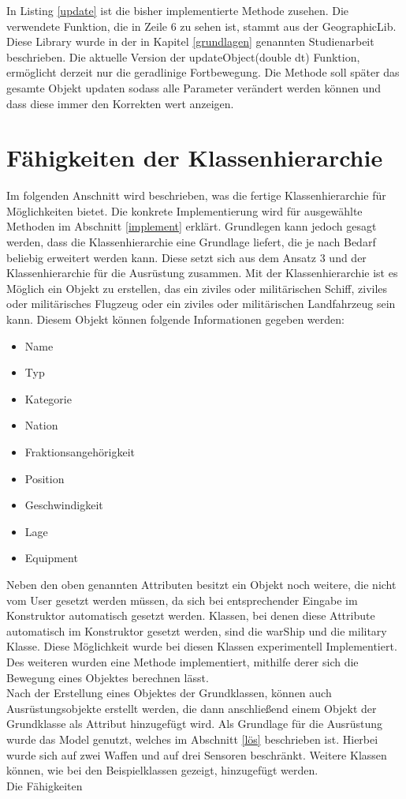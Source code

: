  In  Listing \ref{update} ist die bisher implementierte Methode zusehen. Die verwendete Funktion, die in Zeile 6 zu sehen ist, stammt aus der GeographicLib. Diese Library wurde in der in Kapitel \ref{grundlagen} genannten Studienarbeit beschrieben. Die aktuelle Version der  \glqq updateObject(double dt) \grqq{} Funktion, ermöglicht derzeit nur die geradlinige Fortbewegung. Die Methode soll später das gesamte Objekt updaten sodass alle Parameter verändert werden können und dass diese immer den Korrekten wert anzeigen.
 
 \section{Fähigkeiten der Klassenhierarchie}
Im folgenden Anschnitt wird beschrieben, was die fertige Klassenhierarchie für Möglichkeiten bietet. Die konkrete Implementierung wird für ausgewählte Methoden im Abschnitt \ref{implement} erklärt.
Grundlegen kann jedoch gesagt werden, dass die Klassenhierarchie eine Grundlage liefert, die je nach Bedarf beliebig erweitert werden kann.
Diese setzt sich aus dem Ansatz 3 und der Klassenhierarchie für die Ausrüstung zusammen. 
Mit der Klassenhierarchie ist es Möglich ein Objekt zu erstellen, das ein ziviles oder militärischen Schiff, ziviles oder militärisches Flugzeug oder ein ziviles oder militärischen Landfahrzeug sein kann. Diesem Objekt können folgende Informationen gegeben werden:
\begin{itemize}
	\singlespacing
	\item Name
	\item Typ
	\item Kategorie
	\item Nation
	\item Fraktionsangehörigkeit
	\item Position
	\item Geschwindigkeit
	\item Lage
	\item Equipment
\end{itemize}
Neben den oben genannten Attributen besitzt ein Objekt noch weitere, die nicht vom User gesetzt werden müssen, da sich bei entsprechender Eingabe im Konstruktor automatisch gesetzt werden. Klassen, bei denen diese Attribute automatisch im Konstruktor gesetzt werden, sind die \glqq warShip\grqq{} und die \glqq military\grqq{} Klasse. Diese Möglichkeit wurde bei diesen Klassen experimentell Implementiert.
Des weiteren wurden eine Methode implementiert, mithilfe derer sich die Bewegung eines Objektes berechnen lässt. \\
Nach der Erstellung eines Objektes der Grundklassen, können auch Ausrüstungsobjekte erstellt werden, die dann anschließend einem Objekt der Grundklasse als Attribut hinzugefügt wird. Als Grundlage für die Ausrüstung wurde das Model genutzt, welches im Abschnitt \ref{lös} beschrieben ist. Hierbei wurde sich auf zwei Waffen und auf drei Sensoren beschränkt. Weitere Klassen können, wie bei den Beispielklassen gezeigt, hinzugefügt werden. \\
Die Fähigkeiten 


